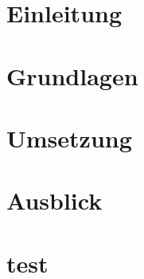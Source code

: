 \documentclass[
ngerman          			%
,a4paper          			%
, 12pt
,pdftex
]{article}
\begin{document}
	\begin{abstract}
		
		\thispagestyle{empty}
	\end{abstract}
	\clearpage
%		
	
	
	\setcounter{page}{1}
	
	
	\cfoot{\thepage}
	
	
	\clearpage
	\section{Einleitung}
	\label{sec:Einleitung}
	
	
	\clearpage
	\section{Grundlagen}
	\label{sec:Grundlagen}
	
	\clearpage
	\section{Umsetzung}
	\label{sec:Umsetzung}
	
	\clearpage
	\section{Ausblick}
	\label{sec:Ausblick}
	
	
	\clearpage
	\setcounter{page}{8}	%
	
	\appendix
	\section{test}
	
	\clearpage
	
	\def\refname{Literaturverzeichnis}
	\printbibliography
	\printglossary[title={Abkürzungsverzeichnis},type=\acronymtype]
\end{document}
